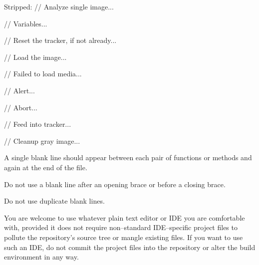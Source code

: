 Stripped:
\startCodeExample
// Analyze single image...

    // Variables...

    // Reset the tracker, if not already...

    // Load the image...

        // Failed to load media...

            // Alert...

            // Abort...

    // Feed into tracker...
    
    // Cleanup gray image...
\stopCodeExample

\item
A single blank line should appear between each pair of functions or methods and again at the end of the file.

\item
Do not use a blank line after an opening brace or before a closing brace.

\item
Do not use duplicate blank lines.
\stopitemize


You are welcome to use whatever plain text editor or IDE you are comfortable with, provided it does not require non--standard IDE--specific project files to pollute the repository's source tree or mangle existing files. If you want to use such an IDE, do not commit the project files into the repository or alter the build environment in any way. 


